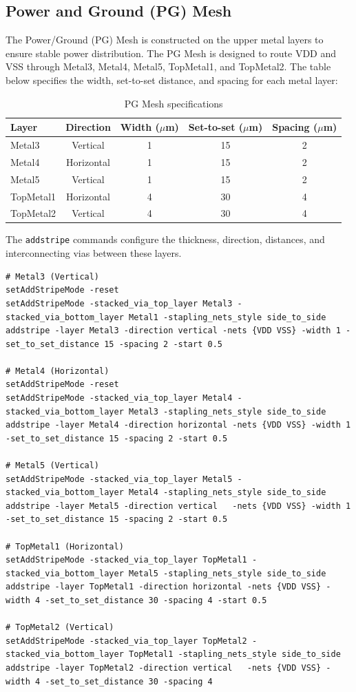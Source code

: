 \documentclass[12pt,a4paper]{article}
\begin{document}
\subsection{Power and Ground (PG) Mesh}
The Power/Ground (PG) Mesh is constructed on the upper metal layers to ensure stable power distribution. The PG Mesh is designed to route VDD and VSS through Metal3, Metal4, Metal5, TopMetal1, and TopMetal2. The table below specifies the width, set-to-set distance, and spacing for each metal layer:

\begin{table}[H]
    \centering
    \caption{PG Mesh specifications}
    \begin{tabular}{|l|c|c|c|c|}
        \hline
        \textbf{Layer} & \textbf{Direction} & \textbf{Width ($\mu$m)} & \textbf{Set-to-set ($\mu$m)} & \textbf{Spacing ($\mu$m)} \\
        \hline
        Metal3 & Vertical & 1 & 15 & 2 \\
        Metal4 & Horizontal & 1 & 15 & 2 \\
        Metal5 & Vertical & 1 & 15 & 2 \\
        TopMetal1 & Horizontal & 4 & 30 & 4 \\
        TopMetal2 & Vertical & 4 & 30 & 4 \\
        \hline
    \end{tabular}
\end{table}

The \texttt{addstripe} commands configure the thickness, direction, distances, and interconnecting vias between these layers.

\begin{lstlisting}[caption={PG Mesh setup}]
# Metal3 (Vertical)
setAddStripeMode -reset
setAddStripeMode -stacked_via_top_layer Metal3 -stacked_via_bottom_layer Metal1 -stapling_nets_style side_to_side
addstripe -layer Metal3 -direction vertical -nets {VDD VSS} -width 1 -set_to_set_distance 15 -spacing 2 -start 0.5

# Metal4 (Horizontal)
setAddStripeMode -reset
setAddStripeMode -stacked_via_top_layer Metal4 -stacked_via_bottom_layer Metal3 -stapling_nets_style side_to_side
addstripe -layer Metal4 -direction horizontal -nets {VDD VSS} -width 1 -set_to_set_distance 15 -spacing 2 -start 0.5

# Metal5 (Vertical)
setAddStripeMode -stacked_via_top_layer Metal5 -stacked_via_bottom_layer Metal4 -stapling_nets_style side_to_side
addstripe -layer Metal5 -direction vertical   -nets {VDD VSS} -width 1 -set_to_set_distance 15 -spacing 2 -start 0.5

# TopMetal1 (Horizontal)
setAddStripeMode -stacked_via_top_layer TopMetal1 -stacked_via_bottom_layer Metal5 -stapling_nets_style side_to_side
addstripe -layer TopMetal1 -direction horizontal -nets {VDD VSS} -width 4 -set_to_set_distance 30 -spacing 4 -start 0.5

# TopMetal2 (Vertical)
setAddStripeMode -stacked_via_top_layer TopMetal2 -stacked_via_bottom_layer TopMetal1 -stapling_nets_style side_to_side
addstripe -layer TopMetal2 -direction vertical   -nets {VDD VSS} -width 4 -set_to_set_distance 30 -spacing 4
\end{lstlisting}
\end{document}
